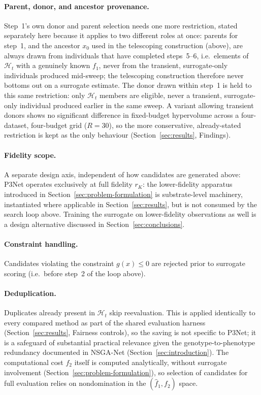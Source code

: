 \paragraph{Parent, donor, and ancestor provenance.} Step~1's own donor and parent selection needs one more restriction, stated separately here because it applies to two different roles at once: parents for step~1, and the ancestor $x_0$ used in the telescoping construction (above), are always drawn from individuals that have completed steps~5--6, i.e.\ elements of $\mathcal{H}_t$ with a genuinely known $f_1$, never from the transient, surrogate-only individuals produced mid-sweep; the telescoping construction therefore never bottoms out on a surrogate estimate. The donor drawn within step~1 is held to this same restriction: only $\mathcal{H}_t$ members are eligible, never a transient, surrogate-only individual produced earlier in the same sweep. A variant allowing transient donors shows no significant difference in fixed-budget hypervolume across a four-dataset, four-budget grid ($R=30$), so the more conservative, already-stated restriction is kept as the only behaviour (Section~\ref{sec:results}, Findings).

\paragraph{Fidelity scope.} A separate design axis, independent of how candidates are generated above: P3Net operates exclusively at full fidelity $r_K$: the lower-fidelity apparatus introduced in Section~\ref{sec:problem-formulation} is substrate-level machinery, instantiated where applicable in Section~\ref{sec:results}, but is not consumed by the search loop above. Training the surrogate on lower-fidelity observations as well is a design alternative discussed in Section~\ref{sec:conclusions}.

\paragraph{Constraint handling.} Candidates violating the constraint $g(x) \leq 0$ are rejected prior to surrogate scoring (i.e.\ before step~2 of the loop above).

\paragraph{Deduplication.} Duplicates already present in $\mathcal{H}_t$ skip reevaluation. This is applied identically to every compared method as part of the shared evaluation harness (Section~\ref{sec:results}, Fairness controls), so the saving is not specific to P3Net; it is a safeguard of substantial practical relevance given the genotype-to-phenotype redundancy documented in NSGA-Net (Section~\ref{sec:introduction}). The computational cost $f_2$ itself is computed analytically, without surrogate involvement (Section~\ref{sec:problem-formulation}), so selection of candidates for full evaluation relies on nondomination in the $(\hat{f}_1, f_2)$ space.

